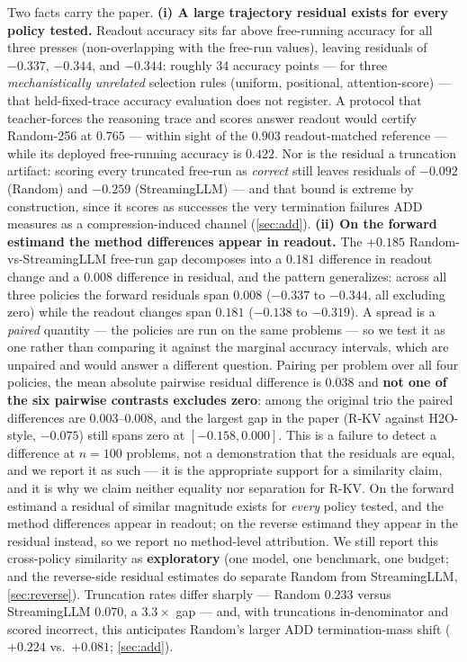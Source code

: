 \documentclass{article}
\begin{document}
Two facts carry the paper. \textbf{(i) A large trajectory residual exists for every policy tested.} Readout accuracy sits far above free-running accuracy for all three presses (non-overlapping with the free-run values), leaving residuals of $-0.337$, $-0.344$, and $-0.344$: roughly 34 accuracy points --- for three \emph{mechanistically unrelated} selection rules (uniform, positional, attention-score) --- that held-fixed-trace accuracy evaluation does not register. A protocol that teacher-forces the reasoning trace and scores answer readout would certify Random-256 at $0.765$ --- within sight of the $0.903$ readout-matched reference --- while its deployed free-running accuracy is $0.422$. Nor is the residual a truncation artifact: scoring every truncated free-run as \emph{correct} still leaves residuals of $-0.092$ (Random) and $-0.259$ (StreamingLLM) --- and that bound is extreme by construction, since it scores as successes the very termination failures ADD measures as a compression-induced channel (\cref{sec:add}). \textbf{(ii) On the forward estimand the method differences appear in readout.} The $+0.185$ Random-vs-StreamingLLM free-run gap decomposes into a $0.181$ difference in readout change and a $0.008$ difference in residual, and the pattern generalizes: across all three policies the forward residuals span $0.008$ ($-0.337$ to $-0.344$, all excluding zero) while the readout changes span $0.181$ ($-0.138$ to $-0.319$). A spread is a \emph{paired} quantity --- the policies are run on the same problems --- so we test it as one rather than comparing it against the marginal accuracy intervals, which are unpaired and would answer a different question. Pairing per problem over all four policies, the mean absolute pairwise residual difference is $0.038$ and \textbf{not one of the six pairwise contrasts excludes zero}: among the original trio the paired differences are $0.003$--$0.008$, and the largest gap in the paper (R-KV against H2O-style, $-0.075$) still spans zero at $[-0.158, 0.000]$. This is a failure to detect a difference at $n{=}100$ problems, not a demonstration that the residuals are equal, and we report it as such --- it is the appropriate support for a similarity claim, and it is why we claim neither equality nor separation for R-KV. On the forward estimand a residual of similar magnitude exists for \emph{every} policy tested, and the method differences appear in readout; on the reverse estimand they appear in the residual instead, so we report no method-level attribution. We still report this cross-policy similarity as \textbf{exploratory} (one model, one benchmark, one budget; and the reverse-side residual estimates do separate Random from StreamingLLM, \cref{sec:reverse}). Truncation rates differ sharply --- Random $0.233$ versus StreamingLLM $0.070$, a $3.3\times$ gap --- and, with truncations in-denominator and scored incorrect, this anticipates Random's larger ADD termination-mass shift ($+0.224$ vs.\ $+0.081$; \cref{sec:add}).
\end{document}
